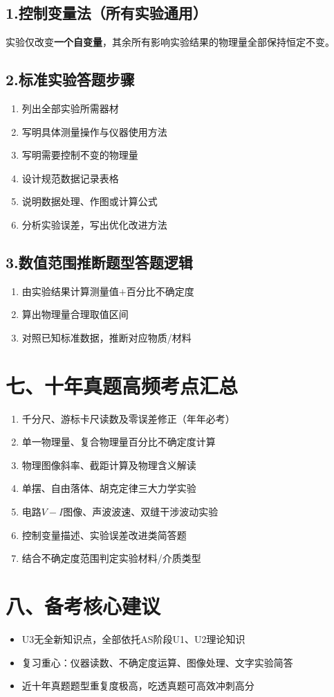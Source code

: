 \documentclass[a4paper,11pt]{article}
\begin{document}
\subsection{1.控制变量法（所有实验通用）}
实验仅改变\textbf{一个自变量}，其余所有影响实验结果的物理量全部保持恒定不变。

\subsection{2.标准实验答题步骤}
\begin{enumerate}
    \item 列出全部实验所需器材
    \item 写明具体测量操作与仪器使用方法
    \item 写明需要控制不变的物理量
    \item 设计规范数据记录表格
    \item 说明数据处理、作图或计算公式
    \item 分析实验误差，写出优化改进方法
\end{enumerate}

\subsection{3.数值范围推断题型答题逻辑}
\begin{enumerate}
    \item 由实验结果计算测量值$+$百分比不确定度
    \item 算出物理量合理取值区间
    \item 对照已知标准数据，推断对应物质/材料
\end{enumerate}

\section{七、十年真题高频考点汇总}
\begin{enumerate}
    \item 千分尺、游标卡尺读数及零误差修正（年年必考）
    \item 单一物理量、复合物理量百分比不确定度计算
    \item 物理图像斜率、截距计算及物理含义解读
    \item 单摆、自由落体、胡克定律三大力学实验
    \item 电路$V-I$图像、声波波速、双缝干涉波动实验
    \item 控制变量描述、实验误差改进类简答题
    \item 结合不确定度范围判定实验材料/介质类型
\end{enumerate}

\section{八、备考核心建议}
\begin{itemize}
    \item U3无全新知识点，全部依托AS阶段U1、U2理论知识
    \item 复习重心：仪器读数、不确定度运算、图像处理、文字实验简答
    \item 近十年真题题型重复度极高，吃透真题可高效冲刺高分
\end{itemize}
\end{document}
